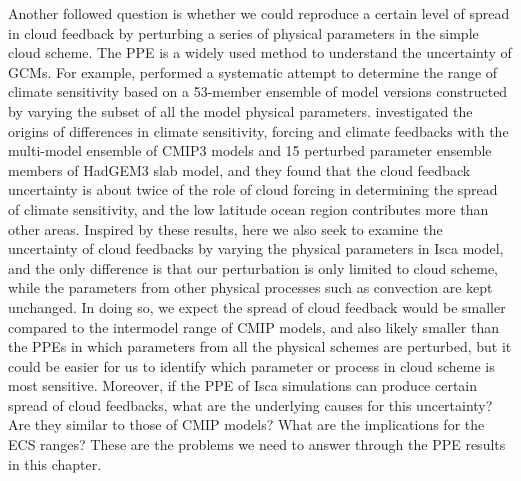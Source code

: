 Another followed question is whether we could reproduce a certain level of spread in cloud feedback by perturbing a series of physical parameters in the simple cloud scheme. The PPE is a widely used method to understand the uncertainty of GCMs. For example, \cite{Murphy2004quantification} performed a systematic attempt to determine the range of climate sensitivity based on a 53-member ensemble of model versions constructed by varying the subset of all the model physical parameters. \cite{Webb2013origins} investigated the origins of differences in climate sensitivity, forcing and climate feedbacks with the multi-model ensemble of CMIP3 models and 15 perturbed parameter ensemble members of HadGEM3 slab model, and they found that the cloud feedback uncertainty is about twice of the role of cloud forcing in determining the spread of climate sensitivity, and the low latitude ocean region contributes more than other areas. Inspired by these results, here we also seek to examine the uncertainty of cloud feedbacks by varying the physical parameters in Isca model, and the only difference is that our perturbation is only limited to cloud scheme, while the parameters from other physical processes such as convection are kept unchanged. In doing so, we expect the spread of cloud feedback would be smaller compared to the intermodel range of CMIP models, and also likely smaller than the PPEs in which parameters from all the physical schemes are perturbed, but it could be easier for us to identify which parameter or process in cloud scheme is most sensitive. Moreover, if the PPE of Isca simulations can produce certain spread of cloud feedbacks, what are the underlying causes for this uncertainty? Are they similar to those of CMIP models? What are the implications for the ECS ranges? These are the problems we need to answer through the PPE results in this chapter.


